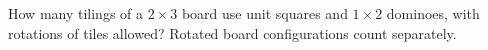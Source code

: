 How many tilings of a $ 2\times3 $ board use unit squares and $ 1\times2 $ dominoes, with rotations of tiles allowed? Rotated board configurations count separately.
